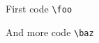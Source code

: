 \documentclass{article}
\begin{document}
\begin{scontents}[print-env=true]
    First code \verb|\foo|

    And more code \verb|\baz|
\end{scontents}

{}
\end{document}
